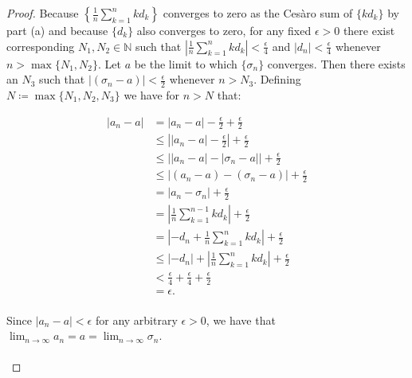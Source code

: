 \begin{proof}
        \pagebreak
        Because
        $\left\{\frac{1}{n}\sum\limits_{k=1}^{n}{kd_k}\right\}$ converges to
        zero as the Cesàro sum of $\{kd_k\}$ by part (a) and because $\{d_k\}$
        also converges to zero\footnotemark[3], for any fixed $\epsilon > 0$
        there exist corresponding $N_1, N_2 \in \mathbb{N}$ such that
        $\left|\frac{1}{n}\sum\limits_{k=1}^{n}{kd_k}\right| < \frac{\epsilon}{4}$
        and $|d_n| < \frac{\epsilon}{4}$ whenever $n > \max{\{N_1, N_2\}}$. Let
        $a$ be the limit to which $\{\sigma_n\}$ converges. Then there exists
        an $N_3$ such that $|(\sigma_n - a)| < \frac{\epsilon}{2}$ whenever
        $n > N_3$. Defining $N \coloneqq \max{\{N_1, N_2, N_3}\}$ we have for
        $n > N$ that:


        \begin{align*}
            |a_n - a| &= |a_n - a| - \frac{\epsilon}{2} + \frac{\epsilon}{2} \\
                      &\le \left| |a_n - a| - \frac{\epsilon}{2}\right| + \frac{\epsilon}{2}  \\
                      &\le \Big| |a_n - a | - |\sigma_n - a| \Big| + \frac{\epsilon}{2}  \\
                      &\le |(a_n - a ) - (\sigma_n - a)| + \frac{\epsilon}{2} \\
                      &= |a_n - \sigma_n| + \frac{\epsilon}{2} \\
                      &= \left|\frac{1}{n}\sum\limits_{k=1}^{n-1}{kd_k}\right| + \frac{\epsilon}{2} \\
                      &= \left| -d_n + \frac{1}{n}\sum\limits_{k=1}^{n}{kd_k} \right| + \frac{\epsilon}{2} \\
                      &\le |-d_n| + \left|\frac{1}{n}\sum\limits_{k=1}^{n}{kd_k}\right| + \frac{\epsilon}{2} \\
                      &< \frac{\epsilon}{4} + \frac{\epsilon}{4} + \frac{\epsilon}{2} \\
                      &= \epsilon. \\
        \end{align*}

        Since $|a_n - a| < \epsilon$ for any arbitrary $\epsilon > 0$, we have
        that  $\lim_{n \rightarrow \infty}{a_n} = a = \lim_{n \rightarrow \infty}{\sigma_n}$.
        \\\\
        \renewcommand*{\thefootnote}{\arabic{footnote}}

    \end{proof}